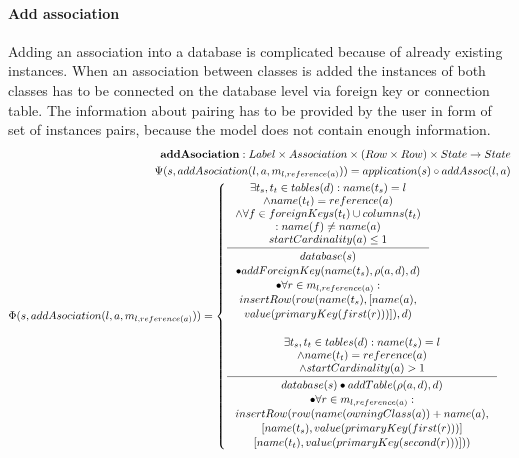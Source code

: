 \documentclass[11pt]{article}
\begin{document}
\paragraph{Add association} Adding an association into a database is complicated because of already existing instances. When an association between classes is added the instances of both classes has to be connected on the database level via foreign key or connection table. The information about pairing has to be provided by the user in form of set of instances pairs, because the model does not contain enough information. 
\begin{align*}
\mathbf{addAsociation} : Label \times Association \times (Row \times Row) \times State \rightarrow State \\
\Psi(s, addAsociation(l, a, m_{l, reference(a)})) = application(s) \circ addAssoc(l, a) \\
\Phi(s, addAsociation(l, a, m_{l, reference(a)})) = \begin{cases}
	\inference{ \exists t_s, t_t \in tables(d) : name(t_s) = l\\ 		\wedge name(t_t) = reference(a) \\ \wedge \forall f \in foreignKeys(t_t) \cup columns(t_t) \\: name(f) \neq name(a) \\ startCardinality(a) \leq 1}{\begin{gathered}
		database(s) \\ \bullet addForeignKey(name(t_s), \rho(a,d), d) \\ \bullet \forall r \in m_{l, reference(a)} : \\ insertRow(row(name(t_s), [name(a), \\ value(primaryKey(first(r)))]), d)
	\end{gathered}}
 \\ \\
	\inference{ \exists t_s, t_t \in tables(d) : name(t_s) = l \\ \wedge name(t_t) = reference(a) \\ \wedge startCardinality(a) > 1}{\begin{gathered} 
	database(s) \bullet addTable(\rho(a,d),d) \\ \bullet \forall r \in m_{l, reference(a)} :\\ insertRow(row(name(owningClass(a)) + name(a), \\ [name(t_s), value(primaryKey(first(r)))]\\ [name(t_t), value(primaryKey(second(r)))]))
	\end{gathered}} 
\end{cases}\\
\end{align*}
\end{document}
